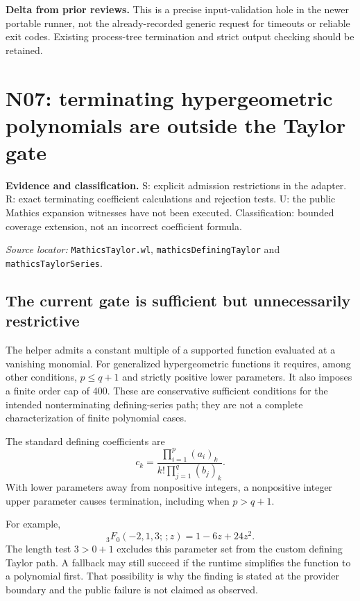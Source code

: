 \documentclass[11pt,letterpaper]{article}
\newcommand{\code}[1]{\nolinkurl{#1}}
\newcommand{\source}[1]{\par\textit{Source locator:} #1\par}
\newcommand{\status}[1]{\par\textbf{Evidence and classification.} #1\par}
\newcommand{\novelty}[1]{\par\textbf{Delta from prior reviews.} #1\par}
\begin{document}
\novelty{This is a precise input-validation hole in the newer portable
runner, not the already-recorded generic request for timeouts or reliable
exit codes. Existing process-tree termination and strict output checking
should be retained.}

\section{N07: terminating hypergeometric polynomials are outside the Taylor gate}
\label{sec:hypergeom}
\status{S: explicit admission restrictions in the adapter. R: exact
terminating coefficient calculations and rejection tests. U: the public
Mathics expansion witnesses have not been executed. Classification: bounded
coverage extension, not an incorrect coefficient formula.}
\source{\code{MathicsTaylor.wl}, \code{mathicsDefiningTaylor} and
\code{mathicsTaylorSeries}. \cite{repo-mtaylor}}

\subsection{The current gate is sufficient but unnecessarily restrictive}
The helper admits a constant multiple of a supported function evaluated
at a vanishing monomial. For generalized hypergeometric functions it
requires, among other conditions, $p\le q+1$ and strictly positive lower
parameters. It also imposes a finite order cap of 400. These are conservative
sufficient conditions for the intended nonterminating defining-series path;
they are not a complete characterization of finite polynomial cases.

The standard defining coefficients are
\begin{equation}
 c_k=\frac{\prod_{i=1}^p(a_i)_k}
           {k!\prod_{j=1}^q(b_j)_k}.
 \label{eq:pfq}
\end{equation}
With lower parameters away from nonpositive integers, a nonpositive integer
upper parameter causes termination, including when $p>q+1$.
\cite{dlmf-hyper}

For example,
\begin{equation}
 {}_3F_0(-2,1,3;\,;z)=1-6z+24z^2.
 \label{eq:3f0}
\end{equation}
The length test $3>0+1$ excludes this parameter set from the custom defining
Taylor path. A fallback may still succeed if the runtime simplifies the
function to a polynomial first. That possibility is why the finding is
stated at the provider boundary and the public failure is not claimed as
observed.
\end{document}
